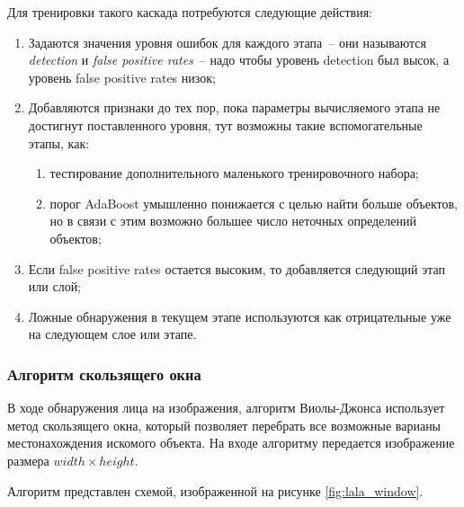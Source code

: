 Для тренировки такого каскада потребуются следующие действия:
\begin{enumerate}
    \item Задаются значения уровня ошибок для каждого этапа~-- они называются \textit{detection} и \textit{false positive
        rates}~-- надо чтобы уровень detection был высок, а уровень false positive rates низок;
    \item Добавляются признаки до тех пор, пока параметры вычисляемого этапа не достигнут поставленного уровня, тут возможны такие
        вспомогательные этапы, как:
        \begin{enumerate}
            \item тестирование дополнительного маленького тренировочного набора;
            \item порог AdaBoost умышленно понижается с целью найти больше объектов, но в связи с этим возможно большее число
                неточных определений объектов;
        \end{enumerate}
    \item Если false positive rates остается высоким, то добавляется следующий этап или слой;
    \item Ложные обнаружения в текущем этапе используются как отрицательные уже на следующем слое или этапе.
\end{enumerate}

\subsubsection{Алгоритм скользящего окна}

В ходе обнаружения лица на изображения, алгоритм Виолы-Джонса использует
метод скользящего окна, который позволяет перебрать все возможные варианы местонахождения
искомого объекта. На входе алгоритму передается изображение размера $ width \times height $.

Алгоритм представлен схемой, изображенной на рисунке \ref{fig:lala_window}.

